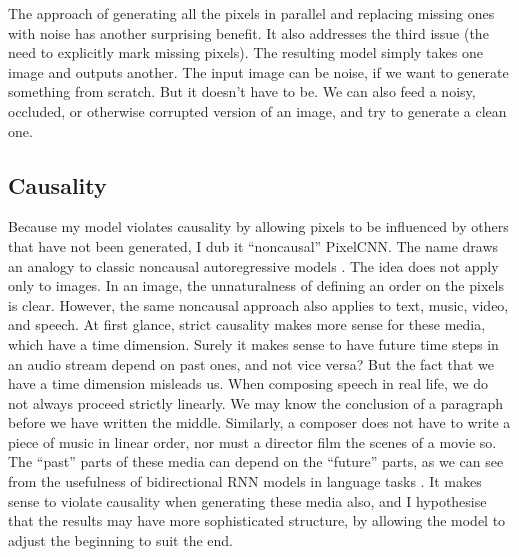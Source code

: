 \documentclass[11pt, a4paper]{book}
\newcommand{\nquote}[1]{``{#1}''}
\begin{document}
The approach of generating all the pixels in parallel and replacing missing ones with noise has another surprising benefit. It also addresses the third issue (the need to explicitly mark missing pixels). The resulting model simply takes one image and outputs another. The input image can be noise, if we want to generate something from scratch. But it doesn't have to be. We can also feed a noisy, occluded, or otherwise corrupted version of an image, and try to generate a clean one.

\subsection{Causality}

Because my model violates causality by allowing pixels to be influenced by others that have not been generated, I dub it \nquote{noncausal} PixelCNN. The name draws an analogy to classic noncausal autoregressive models \citep{noncausalimage2,noncausaleco2}. The idea does not apply only to images. In an image, the unnaturalness of defining an order on the pixels is clear. However, the same noncausal approach also applies to text, music, video, and speech. At first glance, strict causality makes more sense for these media, which have a time dimension. Surely it makes sense to have future time steps in an audio stream depend on past ones, and not vice versa? But the fact that we have a time dimension misleads us. When composing speech in real life, we do not always proceed strictly linearly. We may know the conclusion of a paragraph before we have written the middle. Similarly, a composer does not have to write a piece of music in linear order, nor must a director film the scenes of a movie so. The \nquote{past} parts of these media can depend on the \nquote{future} parts, as we can see from the usefulness of bidirectional RNN models in language tasks \citep{brnnuse1,brnnuse2,brnnuse3}. It makes sense to violate causality when generating these media also, and I hypothesise that the results may have more sophisticated structure, by allowing the model to adjust the beginning to suit the end.
\end{document}
